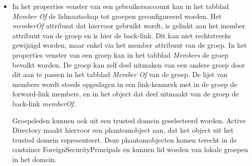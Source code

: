\begin{enumerate}
		 {
			\begin{itemize}
				\item In het properties venster van een gebruikersaccount kan in het tabblad \emph{Member Of} de lidmaatschap tot groepen geconfigureerd worden. Het \emph{memberOf} attribuut dat hiervoor gebruikt wordt, is gelinkt aan het member attribuut van de groep en is hier de back-link. Dit kan niet rechtstreeks gewijzigd worden, maar enkel via het member attribuut van de groep. In het properties venster van een groep kan in het tabblad \emph{Members} de groep bevolkt worden. De groep kan zelf deel uitmaken van een andere groep door dit aan te passen in het tabblad \emph{Member Of} van de groep. De lijst van members wordt steeds opgeslagen in een link-kenmerk met in de groep de forward-link members, en in het object dat deel uitmaakt van de groep de back-link \emph{memberOf}. 

				Groepsleden kunnen ook uit een trusted domein geselecteerd worden. Active Directory maakt hiervoor een phantomobject aan, dat het object uit het trusted domein representeert. Deze phantomobjecten komen terecht in de container ForeignSecurityPrincipals en kunnen lid worden van lokale groepen in het domein.
			\end{itemize}
			 }
		
		 { }
		
		 { }
	\end{enumerate}